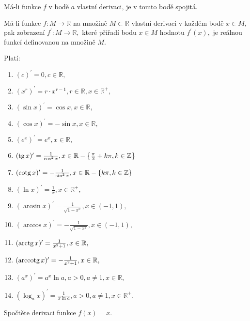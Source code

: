 \begin{veta}[Bolzanova]
Má-li funkce $f$ v bodě $a$ vlastní derivaci, je v tomto bodě spojitá.
\end{veta}

\begin{pozn}
    Má-li funkce $f:M\to \mathbb R$ na množině $M\subset \mathbb R$ vlastní derivaci
    v každém bodě $x\in M,$ pak zobrazení $f^\prime:M\to \mathbb R,$ které přiřadí
    bodu $x\in M$ hodnotu $f^\prime(x),$ je reálnou funkcí definovanou na množině $M$.
\end{pozn}

\begin{pozn}
Platí:
\begin{enumerate}[$i.$]
\item $(c)^\prime = 0, c \in \mathbb R,$
\item $(x^r)^\prime = r\cdot x^{r-1}, r\in \mathbb R, x \in \mathbb R^+,$
\item $(\sin x)^\prime = \cos x, x \in \mathbb R,$
\item $(\cos x) ^\prime = -\sin x, x \in \mathbb R,$
\item $(e^x)^\prime = e^x,x \in \mathbb R,$
\item $(\operatorname{tg} x)^\prime = \frac{1}{\cos^2 x}, x \in \mathbb R-\left \{ \frac{\pi}{2}+k\pi, k\in \mathbb Z \right \} $
\item $(\operatorname{cotg} x)^\prime = -\frac{1}{\sin^2 x}, x \in \mathbb R-\left \{ k\pi, k \in \mathbb Z \right \} $
\item $(\ln x)^\prime = \frac{1}{x}, x \in \mathbb R^+,$
\item $(\arcsin x)^\prime = \frac{1}{\sqrt{1-x^2}}, x \in(-1,1),$
\item $(\arccos x)^\prime=-\frac{1}{\sqrt{1-x^2} }, x \in (-1,1),$
\item $(\operatorname{arctg} x)^\prime = \frac{1}{x^2+1}, x \in \mathbb R,$
\item $(\operatorname{arccotg} x)^\prime = -\frac{1}{x^2+1}, x \in \mathbb R,$
\item $(a^x)^\prime = a^x \ln a, a>0, a\ne 1, x\in \mathbb R,$
\item $(\log_a x)^\prime=\frac{1}{x\ln a}, a>0, a\ne 1, x \in \mathbb R^+.$
\end{enumerate}
\end{pozn}

\begin{priklad}
  Spočtěte derivaci funkce $f(x)=x.$
\end{priklad}

